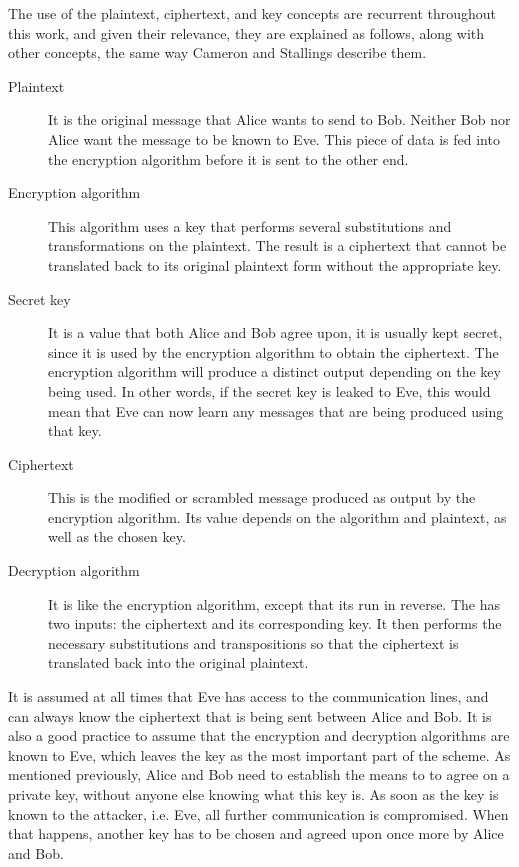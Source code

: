 The use of the plaintext, ciphertext, and key concepts are recurrent throughout this work, and given their relevance, they are explained as follows, along with other concepts, the same way Cameron \cite{CryptoNotes} and Stallings \cite{CryptoStallings} describe them.
\begin{description}
\item[Plaintext] It is the original message that Alice wants to send to Bob. Neither Bob nor Alice want the message to be known to Eve. This piece of data is fed into the encryption algorithm before it is sent to the other end.
\item[Encryption algorithm] This algorithm uses a key that performs several substitutions and transformations on the plaintext. The result is a ciphertext that cannot be translated back to its original plaintext form without the appropriate key.
\item[Secret key] It is a value that both Alice and Bob agree upon, it is usually kept secret, since it is used by the encryption algorithm to obtain the ciphertext. The encryption algorithm will produce a distinct output depending on the key being used. In other words, if the secret key is leaked to Eve, this would mean that Eve can now learn any messages that are being produced using that key.
\item[Ciphertext] This is the modified or scrambled message produced as output by the encryption algorithm. Its value depends on the algorithm and plaintext, as well as the chosen key.
\item[Decryption algorithm] It is like the encryption algorithm, except that its run in reverse. The has two inputs: the ciphertext and its corresponding key. It then performs the necessary substitutions and transpositions so that the ciphertext is translated back into the original plaintext.
\end{description}

It is assumed at all times that Eve has access to the communication lines, and can always know the ciphertext that is being sent between Alice and Bob. It is also a good practice to assume that the encryption and decryption algorithms are known to Eve, which leaves the key as the most important part of the scheme. As mentioned previously, Alice and Bob need to establish the means to to agree on a private key, without anyone else knowing what this key is. As soon as the key is known to the attacker, i.e. Eve, all further communication is compromised. When that happens, another key has to be chosen and agreed upon once more by Alice and Bob.


